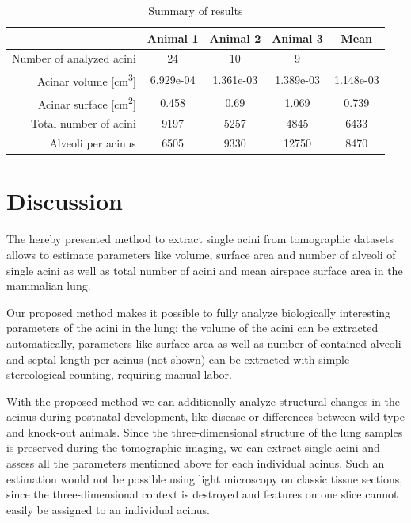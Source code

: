 \documentclass[a4paper,DIV=calc,abstract,english]{scrartcl}
\newcommand{\numberofaciniB}{24}
\newcommand{\numberofaciniD}{10}
\newcommand{\numberofaciniE}{9}
\newcommand{\totalnumberofaciniB}{9197}
\newcommand{\totalnumberofaciniD}{5257}
\newcommand{\totalnumberofaciniE}{4845}
\newcommand{\meantotalnumberofacini}{6433}
\newcommand{\acinarvolumeB}{6.929e-04} %
\newcommand{\acinarvolumeD}{1.361e-03} %
\newcommand{\acinarvolumeE}{1.389e-03} %
\newcommand{\meanacinarvolume}{1.148e-03} %
\newcommand{\numberofalveoliB}{6505}
\newcommand{\numberofalveoliD}{9330}
\newcommand{\numberofalveoliE}{12750}
\newcommand{\meannumberofalveoli}{8470} %
\newcommand{\acinarsurfaceB}{0.458} %
\newcommand{\acinarsurfaceD}{0.69} %
\newcommand{\acinarsurfaceE}{1.069} %
\newcommand{\meanacinarsurface}{0.739} %
\begin{document}
\begin{table}[htb]
	\centering
	\caption{Summary of results}
	\begin{tabular}{rcccc}
	\toprule
															& Animal 1 & Animal 2 & Animal 3 & Mean\\
	\midrule
	Number of analyzed acini 							& \numberofaciniB & \numberofaciniD & \numberofaciniE & \\
	Acinar volume [\si{\cubic\centi\meter}]		& \acinarvolumeB & \acinarvolumeD & \acinarvolumeE & \meanacinarvolume \\
	Acinar surface [\si{\centi\meter\squared}]	& \acinarsurfaceB & \acinarsurfaceD & \acinarsurfaceE & \meanacinarsurface \\
	Total number of acini 								& \totalnumberofaciniB & \totalnumberofaciniD & \totalnumberofaciniE & \meantotalnumberofacini \\
	Alveoli per acinus 									& \numberofalveoliB & \numberofalveoliD & \numberofalveoliE & \meannumberofalveoli \\
	\bottomrule
	\end{tabular}
	\label{tab:results}
\end{table}

\section{Discussion}
The hereby presented method to extract single acini from tomographic datasets allows to estimate parameters like volume, surface area and number of alveoli of single acini as well as total number of acini and mean airspace surface area in the mammalian lung.

Our proposed method makes it possible to fully analyze biologically interesting parameters of the acini in the lung; the volume of the acini can be extracted automatically, parameters like surface area as well as number of contained alveoli and septal length per acinus (not shown) can be extracted with simple stereological counting, requiring manual labor.

With the proposed method we can additionally analyze structural changes in the acinus during postnatal development, like disease or differences between wild-type and knock-out animals.
Since the three-dimensional structure of the lung samples is preserved during the tomographic imaging, we can extract single acini and assess all the parameters mentioned above for each individual acinus.
Such an estimation would not be possible using light microscopy on classic tissue sections, since the three-dimensional context is destroyed and features on one slice cannot easily be assigned to an individual acinus.
\end{document}
